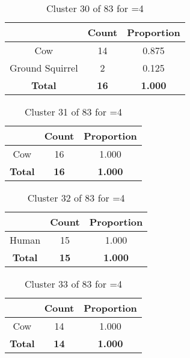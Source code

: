 \clearpage
\begin{table}[ht!]
\centering
\begin{tabular}{|c|c|c|}
\hline
\bf \Spec{} &\bf Count &\bf Proportion\\ \hline \hline
Cow & 14 & 0.875\\ \hline
Ground Squirrel & 2 & 0.125\\ \hline
\hline
\bf Total & \bf 16 & \bf 1.000\\ \hline
\end{tabular}
\label{tab:cluster:30:4}
\caption{Cluster 30 of 83 for \minneigh{}=4}
\end{table}

\begin{table}[ht!]
\centering
\begin{tabular}{|c|c|c|}
\hline
\bf \Spec{} &\bf Count &\bf Proportion\\ \hline \hline
Cow & 16 & 1.000\\ \hline
\hline
\bf Total & \bf 16 & \bf 1.000\\ \hline
\end{tabular}
\label{tab:cluster:31:4}
\caption{Cluster 31 of 83 for \minneigh{}=4}
\end{table}

\begin{table}[ht!]
\centering
\begin{tabular}{|c|c|c|}
\hline
\bf \Spec{} &\bf Count &\bf Proportion\\ \hline \hline
Human & 15 & 1.000\\ \hline
\hline
\bf Total & \bf 15 & \bf 1.000\\ \hline
\end{tabular}
\label{tab:cluster:32:4}
\caption{Cluster 32 of 83 for \minneigh{}=4}
\end{table}

\begin{table}[ht!]
\centering
\begin{tabular}{|c|c|c|}
\hline
\bf \Spec{} &\bf Count &\bf Proportion\\ \hline \hline
Cow & 14 & 1.000\\ \hline
\hline
\bf Total & \bf 14 & \bf 1.000\\ \hline
\end{tabular}
\label{tab:cluster:33:4}
\caption{Cluster 33 of 83 for \minneigh{}=4}
\end{table}

